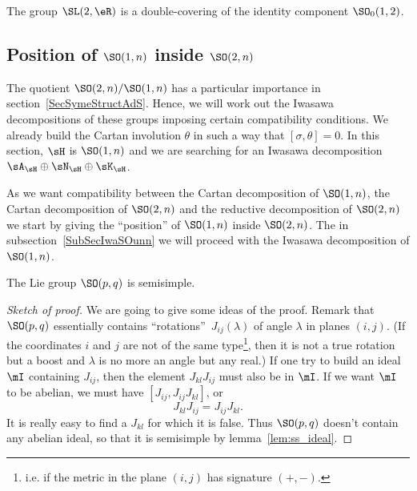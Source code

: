 \begin{proposition}
	The group $\SL(2,\eR)$ is a double-covering of the identity component $\SO_0(1,2)$.
\end{proposition}

\subsection{Position of \texorpdfstring{$ \SO(1,n)$}{SO(1,n)} inside \texorpdfstring{$ \SO(2,n)$}{SO(2,n)}}

The quotient $\SO(2,n)/\SO(1,n)$ has a particular importance in section~\ref{SecSymeStructAdS}. Hence, we will work out the Iwasawa decompositions of these groups imposing certain compatibility conditions. We already build the Cartan involution $\theta$ in such a way that $[\sigma,\theta]=0$. In this section, \( \sH\) is \( \SO(1,n)\) and we are searching for an Iwasawa decomposition \( \sA_{\sH}\oplus\sN_{\sH}\oplus\sK_{\sH}\).

As we want compatibility between the Cartan decomposition of \( \SO(1,n)\), the Cartan decomposition of \( \SO(2,n)\) and the reductive decomposition of \( \SO(2,n)\) we start by giving the ``position'' of \( \SO(1,n)\) inside \( \SO(2,n)\). The in subsection~\ref{SubSecIwaSOunn} we will proceed with the Iwasawa decomposition of \( \SO(1,n)\).



\begin{lemma} \label{lem:SO_pq_ss}
	The Lie group $\SO(p,q)$ is semisimple.
\end{lemma}

\begin{proof}[Sketch of proof]
	We are going to give some ideas of the proof. Remark that $\SO(p,q)$ essentially contains ``rotations''\ $J_{ij}(\lambda)$ of angle $\lambda$ in planes $(i,j)$. (If the coordinates $i$ and $j$ are not of the same type\footnote{i.e. if the metric in the plane $(i,j)$ has signature $(+,-)$.}, then it is not a true rotation but a boost and $\lambda$ is no more an angle but any real.) If one try to build an ideal $\mI$ containing $J_{ij}$, then the element $J_{kl}J_{ij}$ must also be in $\mI$. If we want $\mI$ to be abelian, we must have $[J_{ij},J_{ij}J_{kl}]$, or
	\[
		J_{kl}J_{ij}=J_{ij}J_{kl}.
	\]
	It is really easy to find a $J_{kl}$ for which it is false. Thus $\SO(p,q)$ doesn't contain any abelian ideal, so that it is semisimple by lemma~\ref{lem:ss_ideal}.
\end{proof}

